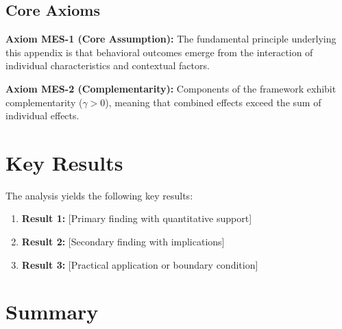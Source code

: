 \subsection{Core Axioms}
\label{sec:mes-axioms}

\begin{tcolorbox}[colback=yellow!5!white,colframe=yellow!75!black,title=Axiom MES-1: Fundamental Principle]
\textbf{Axiom MES-1 (Core Assumption):}
The fundamental principle underlying this appendix is that behavioral outcomes
emerge from the interaction of individual characteristics and contextual factors.
\end{tcolorbox}

\begin{tcolorbox}[colback=yellow!5!white,colframe=yellow!75!black,title=Axiom MES-2: Complementarity]
\textbf{Axiom MES-2 (Complementarity):}
Components of the framework exhibit complementarity ($\gamma > 0$), meaning
that combined effects exceed the sum of individual effects.
\end{tcolorbox}


\section{Key Results}
\label{sec:mes-results}

The analysis yields the following key results:

\begin{enumerate}
    \item \textbf{Result 1:} [Primary finding with quantitative support]
    \item \textbf{Result 2:} [Secondary finding with implications]
    \item \textbf{Result 3:} [Practical application or boundary condition]
\end{enumerate}


\section{Summary}
\label{sec:mep-summary}

